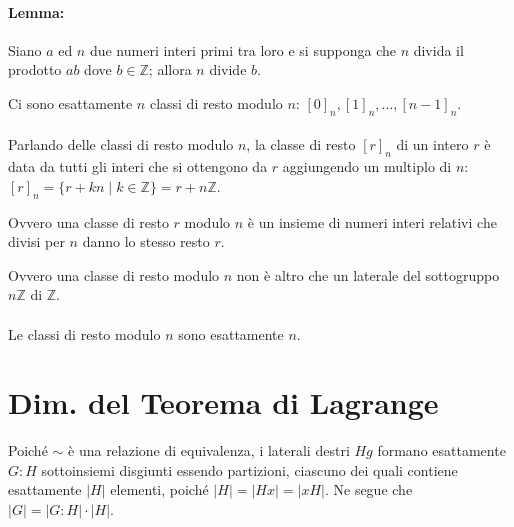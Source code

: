 \documentclass[a4paper]{article}
\begin{document}
        \paragraph{Lemma:}
        Siano $a$ ed $n$ due numeri interi primi tra loro e si supponga che $n$ divida il prodotto $ab$ dove $b \in \mathbb{Z}$; allora $n$ divide $b$.

        Ci sono esattamente $n$ classi di resto modulo $n$: $[0]_n, [1]_n, \ldots, [n - 1]_n$.

        \paragraph{}
        Parlando delle classi di resto modulo $n$, la classe di resto $[r]_n$ di un intero $r$ \`{e} data da tutti gli interi che si ottengono da $r$ aggiungendo un multiplo di $n$: $[r]_n = \{ r + kn \;|\; k \in \mathbb{Z}\} = r + n \mathbb{Z}$.

        \noindent
        Ovvero una classe di resto $r$ modulo $n$ \`{e} un insieme  di numeri interi relativi che divisi per $n$ danno lo stesso resto $r$.

        \noindent
        Ovvero una classe di resto modulo $n$ non \`{e} altro che un laterale del sottogruppo $n \mathbb{Z}$ di $\mathbb{Z}$.

        \paragraph{}
        Le classi di resto modulo $n$ sono esattamente $n$.


        \section*{Dim. del Teorema di Lagrange}
        Poich\'{e} $\sim$ \`{e} una relazione di equivalenza, i laterali destri $Hg$ formano esattamente $ G:H $
        sottoinsiemi disgiunti essendo partizioni, ciascuno dei quali contiene esattamente $|H|$ elementi, poich\'{e}
        $ |H| = |Hx| = |xH|$.  Ne segue che $ |G| = |G:H| \cdot |H| $.
\end{document}
